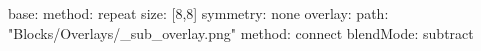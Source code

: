 base:
  method: repeat
  size: [8,8]
  symmetry: none
overlay:
  path: "Blocks/Overlays/_sub_overlay.png"
  method: connect
blendMode: subtract